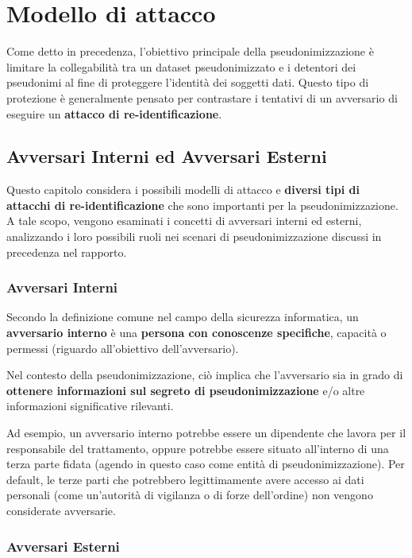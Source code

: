 \chapter{Modello di attacco}

Come detto in precedenza, l'obiettivo principale della pseudonimizzazione è limitare la collegabilità tra un dataset pseudonimizzato e i detentori dei pseudonimi al fine di proteggere l'identità dei soggetti dati. Questo tipo di protezione è generalmente pensato per contrastare i tentativi di un avversario di eseguire un \textbf{attacco di re-identificazione}.

\section{Avversari Interni ed Avversari Esterni}

Questo capitolo considera i possibili modelli di attacco e \textbf{diversi tipi di attacchi di re-identificazione} che sono importanti per la pseudonimizzazione. A tale scopo, vengono esaminati i concetti di avversari interni ed esterni, analizzando i loro possibili ruoli nei scenari di pseudonimizzazione discussi in precedenza nel rapporto. 

\subsection{Avversari Interni}

Secondo la definizione comune nel campo della sicurezza informatica, un \textbf{avversario interno} è una \textbf{persona con conoscenze specifiche}, capacità o permessi (riguardo all'obiettivo dell'avversario). 

Nel contesto della pseudonimizzazione, ciò implica che l'avversario sia in grado di \textbf{ottenere informazioni sul segreto di pseudonimizzazione} e/o altre informazioni significative rilevanti.

Ad esempio, un avversario interno potrebbe essere un dipendente che lavora per il responsabile del trattamento, oppure potrebbe essere situato all'interno di una terza parte fidata (agendo in questo caso come entità di pseudonimizzazione). Per default, le terze parti che potrebbero legittimamente avere accesso ai dati personali (come un'autorità di vigilanza o di forze dell'ordine) non vengono considerate avversarie.

\subsection{Avversari Esterni}


